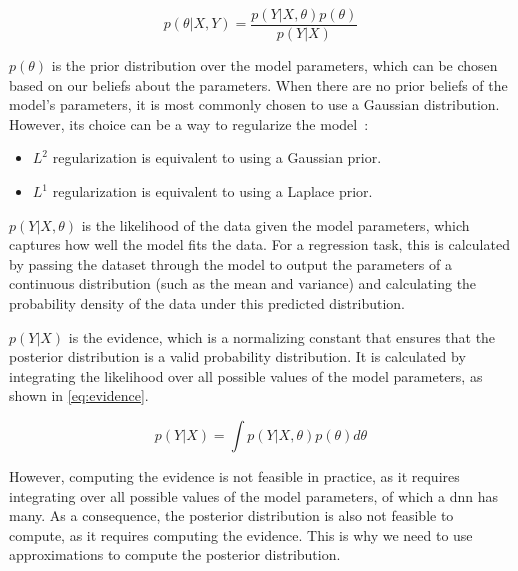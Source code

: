 \begin{equation}
    p(\theta|X, Y) = \frac{p(Y|X, \theta)p(\theta)}{p(Y|X)}
    \label{eq:posterior-distr}
\end{equation}

$p(\theta)$ is the prior distribution over the model parameters, which can be chosen based on our beliefs about the parameters.
When there are no prior beliefs of the model's parameters, it is most commonly chosen to use a Gaussian distribution.
However, its choice can be a way to regularize the model~\cite{src:lecture-notes-bayesian-learning}:

\begin{itemize}
    \item $L^2$ regularization is equivalent to using a Gaussian prior.
    \item $L^1$ regularization is equivalent to using a Laplace prior.
\end{itemize}

$p(Y|X, \theta)$ is the likelihood of the data given the model parameters, which captures how well the model fits the data.
For a regression task, this is calculated by passing the dataset through the model to output the parameters of a continuous distribution (such as the mean and variance) and calculating the probability density of the data under this predicted distribution.

$p(Y|X)$ is the evidence, which is a normalizing constant that ensures that the posterior distribution is a valid probability distribution.
It is calculated by integrating the likelihood over all possible values of the model parameters, as shown in \cref{eq:evidence}.

\begin{equation}
    p(Y|X) = \int p(Y|X, \theta)p(\theta)d\theta
    \label{eq:evidence}
\end{equation}

However, computing the evidence is not feasible in practice, as it requires integrating over all possible values of the model parameters, of which a \gls{dnn} has many.
As a consequence, the posterior distribution is also not feasible to compute, as it requires computing the evidence.
This is why we need to use approximations to compute the posterior distribution.

